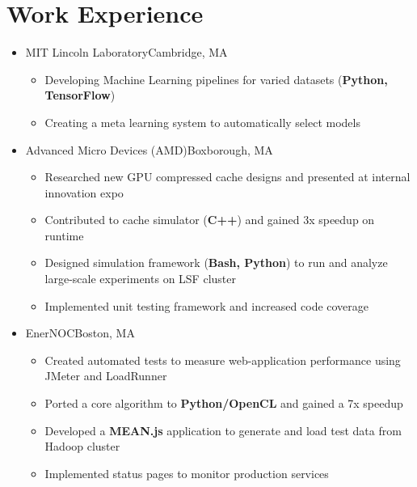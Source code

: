 \documentclass[11pt,letterpaper,sans]{moderncv}
\begin{document}
\section{Work Experience}

\vspace{2pt}

\begin{itemize}

\item[] {
{MIT Lincoln Laboratory}{Cambridge, MA}{}{\vspace{1pt}}
\vspace{-8pt}	\begin{itemize}
	 \item Developing Machine Learning pipelines for varied datasets (\textbf{Python, TensorFlow})
	 \item Creating a meta learning system to automatically select models
	\end{itemize}
}
\vspace{6pt}

\item[] {
{Advanced Micro Devices (AMD)}{Boxborough, MA}{}{\vspace{1pt}}
\vspace{-8pt}	\begin{itemize}
	 \item Researched new GPU compressed cache designs and presented at internal innovation expo
	 \item Contributed to cache simulator (\textbf{C++}) and gained 3x speedup on runtime
	 \item Designed simulation framework (\textbf{Bash, Python}) to run and analyze large-scale experiments on LSF cluster
	 \item Implemented unit testing framework and increased code coverage
	\end{itemize}
}
\vspace{6pt}

\item[] {
{EnerNOC}{Boston, MA}{}{\vspace{1pt}}
\vspace{-8pt}	\begin{itemize}
	 \item Created automated tests to measure web-application performance using JMeter and LoadRunner
	 \item Ported a core algorithm to \textbf{Python/OpenCL} and gained a 7x speedup
	 \item Developed a \textbf{MEAN.js} application to generate and load test data from Hadoop cluster
	 \item Implemented status pages to monitor production services

	\end{itemize}
}


\end{itemize}
\end{document}

